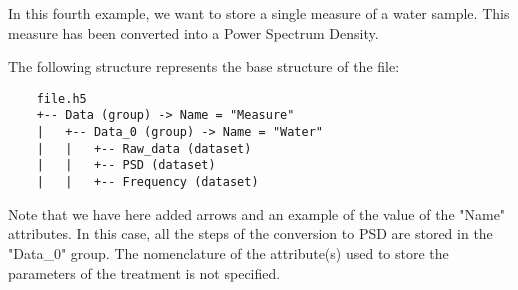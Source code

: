 In this fourth example, we want to store a single measure of a water sample. This measure has been converted into a Power Spectrum Density.

The following structure represents the base structure of the file:
\begin{verbatim}
    file.h5
    +-- Data (group) -> Name = "Measure"
    |   +-- Data_0 (group) -> Name = "Water"
    |   |   +-- Raw_data (dataset)
    |   |   +-- PSD (dataset)
    |   |   +-- Frequency (dataset)
\end{verbatim}
Note that we have here added arrows and an example of the value of the "Name" attributes.
In this case, all the steps of the conversion to PSD are stored in the "Data\_0" group. The nomenclature of the attribute(s) used to store the parameters of the treatment is not specified.